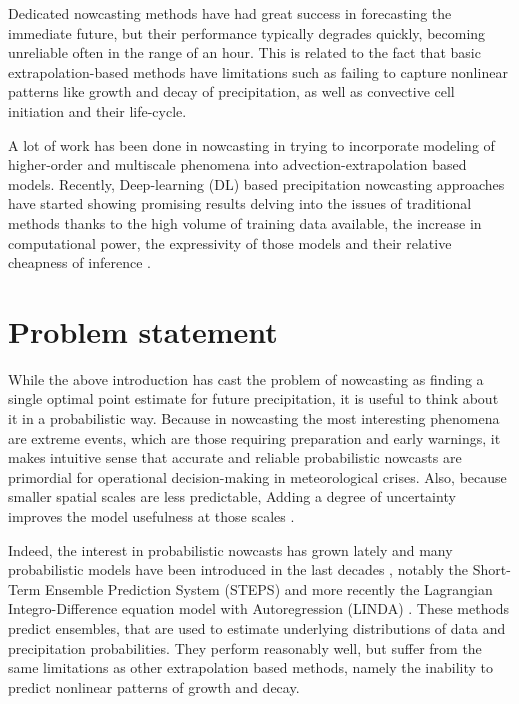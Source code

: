 Dedicated nowcasting methods have had great success in forecasting the immediate future, but their performance typically degrades quickly, becoming unreliable often in the range of an hour. This is related to the fact that basic extrapolation-based methods have limitations such as failing to capture nonlinear patterns like growth and decay of precipitation, as well as convective cell initiation and their life-cycle. 

A lot of work has been done in nowcasting in trying to incorporate modeling of higher-order and multiscale phenomena into advection-extrapolation based models. Recently, Deep-learning (DL) based precipitation nowcasting approaches have started showing promising results delving into the issues of traditional methods thanks to the high volume of training data available, the increase in computational power, the expressivity of those models and their relative cheapness of inference \cite{shi_convolutional_2015,shi_deep_2017,ayzel_rainnet_nodate}.


\section{Problem statement}


While the above introduction has cast the problem of nowcasting as finding a single optimal point estimate for future precipitation, it is useful to think about it in a probabilistic way. Because in nowcasting the most interesting phenomena are extreme events, which are those requiring preparation and early warnings, it makes intuitive sense that accurate and reliable probabilistic nowcasts are primordial for operational decision-making in meteorological crises. Also, because smaller spatial scales are less predictable, Adding a degree of uncertainty improves the model usefulness at those scales \cite{germann2002scale}.

Indeed, the interest in probabilistic nowcasts has grown lately and many probabilistic models have been introduced in the last decades \cite{seed_formulation_2013, andersson1991model, schmid2002short, fox2005bayesian}, notably the Short-Term Ensemble Prediction System (STEPS) \cite{bowler_steps_2006} and more recently the Lagrangian Integro-Difference equation model with Autoregression (LINDA) \cite{pulkkinen_lagrangian_2021}. These methods predict ensembles, that are used to estimate underlying distributions of data and precipitation probabilities. They perform reasonably well, but  suffer from the same limitations as other extrapolation based methods, namely the inability to predict nonlinear patterns of growth and decay. 

